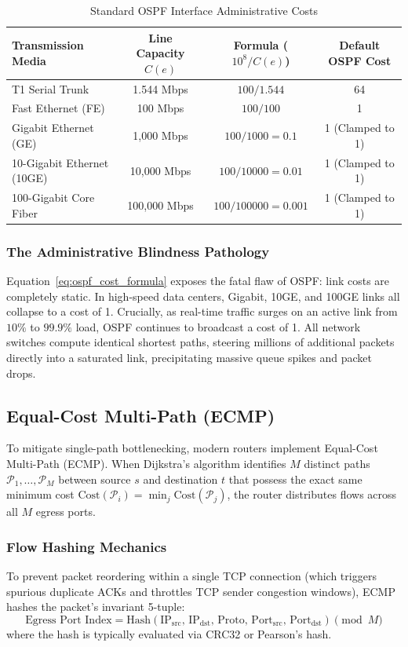 \documentclass[12pt,a4paper,oneside]{report}
\begin{document}
\begin{table}[htbp]
\centering
\caption{Standard OSPF Interface Administrative Costs}
\label{tab:ospf_costs}
\small
\begin{tabular}{l c c c}
\toprule
\textbf{Transmission Media} & \textbf{Line Capacity $C(e)$} & \textbf{Formula ($10^8 / C(e)$)} & \textbf{Default OSPF Cost} \\
\midrule
T1 Serial Trunk & 1.544 Mbps & $100 / 1.544$ & 64 \\
Fast Ethernet (FE) & 100 Mbps & $100 / 100$ & 1 \\
Gigabit Ethernet (GE) & 1,000 Mbps & $100 / 1000 = 0.1$ & 1 (Clamped to 1) \\
10-Gigabit Ethernet (10GE) & 10,000 Mbps & $100 / 10000 = 0.01$ & 1 (Clamped to 1) \\
100-Gigabit Core Fiber & 100,000 Mbps & $100 / 100000 = 0.001$ & 1 (Clamped to 1) \\
\bottomrule
\end{tabular}
\end{table}

\subsubsection{The Administrative Blindness Pathology}
Equation~\ref{eq:ospf_cost_formula} exposes the fatal flaw of OSPF: link costs are completely static. In high-speed data centers, Gigabit, 10GE, and 100GE links all collapse to a cost of 1. Crucially, as real-time traffic surges on an active link from $10\%$ to $99.9\%$ load, OSPF continues to broadcast a cost of 1. All network switches compute identical shortest paths, steering millions of additional packets directly into a saturated link, precipitating massive queue spikes and packet drops.

\subsection{Equal-Cost Multi-Path (ECMP)}
To mitigate single-path bottlenecking, modern routers implement Equal-Cost Multi-Path (ECMP). When Dijkstra's algorithm identifies $M$ distinct paths $\mathcal{P}_1, \dots, \mathcal{P}_M$ between source $s$ and destination $t$ that possess the exact same minimum cost $\text{Cost}(\mathcal{P}_i) = \min_j \text{Cost}(\mathcal{P}_j)$, the router distributes flows across all $M$ egress ports.

\subsubsection{Flow Hashing Mechanics}
To prevent packet reordering within a single TCP connection (which triggers spurious duplicate ACKs and throttles TCP sender congestion windows), ECMP hashes the packet's invariant 5-tuple:
\begin{equation}
    \text{Egress Port Index} = \text{Hash}(\text{IP}_{\text{src}}, \, \text{IP}_{\text{dst}}, \, \text{Proto}, \, \text{Port}_{\text{src}}, \, \text{Port}_{\text{dst}}) \pmod M
\end{equation}
where the hash is typically evaluated via CRC32 or Pearson's hash.
\end{document}
